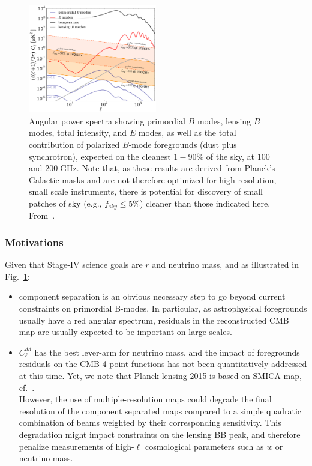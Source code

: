 \begin{figure}[htbp]
\centering
\includegraphics[width=0.5\textwidth]{Analysis/Power_Spectrum_figure_showing_foregrounds.pdf}
\caption{Angular power spectra showing primordial $B$ modes, lensing $B$ modes, total intensity, and $E$ modes, as well as the total contribution of polarized $B$-mode foregrounds (dust plus synchrotron), expected on the cleanest $1-90\%$ of the sky, at $100$ and $200\;$GHz. Note that, as these results are derived from Planck's Galactic masks and are not therefore optimized for high-resolution, small scale instruments, there is potential for discovery of small patches of sky (e.g., $f_{\mathrm sky} \leq 5\%$) cleaner than those indicated here. From~\cite{errard15b}.}
\label{fig:power_spectrum_fgs}
\end{figure}


\subsubsection{Motivations}

Given that Stage-IV science goals are $r$ and neutrino mass, and as illustrated in Fig.~\ref{fig:power_spectrum_fgs}:
\begin{itemize}
	\item component separation is an obvious necessary step to go beyond current constraints on primordial B-modes. In particular, as astrophysical foregrounds usually have a red angular spectrum, residuals in the reconstructed CMB map are usually expected to be important on large scales.
	\item $C_\ell^{dd}$ has the best lever-arm for neutrino mass, and the impact of foregrounds residuals on the CMB 4-point functions has not been quantitatively addressed at this time. Yet, we note that Planck lensing 2015 is based on SMICA map, cf.~\cite{planck15-15}.\\
	However, the use of multiple-resolution maps could degrade the final resolution of the component separated maps compared to a simple quadratic combination of beams weighted by their corresponding sensitivity. This degradation might impact constraints on the lensing BB peak, and therefore penalize measurements of high-$\ell$ cosmological parameters such as $w$ or neutrino mass.
\end{itemize}

